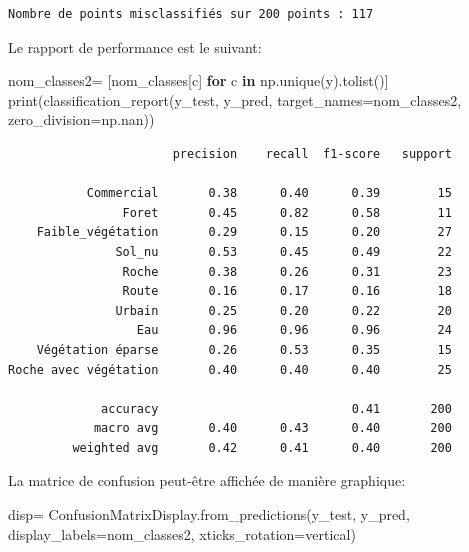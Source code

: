 \documentclass[
]{article}
\newenvironment{Shaded}{}{}
\newcommand{\BuiltInTok}[1]{\textcolor[rgb]{0.00,0.50,0.00}{#1}}
\newcommand{\ControlFlowTok}[1]{\textcolor[rgb]{0.00,0.44,0.13}{\textbf{#1}}}
\newcommand{\KeywordTok}[1]{\textcolor[rgb]{0.00,0.44,0.13}{\textbf{#1}}}
\newcommand{\NormalTok}[1]{#1}
\newcommand{\OperatorTok}[1]{\textcolor[rgb]{0.40,0.40,0.40}{#1}}
\newcommand{\StringTok}[1]{\textcolor[rgb]{0.25,0.44,0.63}{#1}}
\begin{document}
\begin{verbatim}
Nombre de points misclassifiés sur 200 points : 117
\end{verbatim}

Le rapport de performance est le suivant:

\label{8dce079d}
\label{cb31}
\begin{Shaded}
\begin{Highlighting}[]
\NormalTok{nom\_classes2}\OperatorTok{=}\NormalTok{ [nom\_classes[c] }\ControlFlowTok{for}\NormalTok{ c }\KeywordTok{in}\NormalTok{ np.unique(y).tolist()]}
\BuiltInTok{print}\NormalTok{(classification\_report(y\_test, y\_pred, target\_names}\OperatorTok{=}\NormalTok{nom\_classes2, zero\_division}\OperatorTok{=}\NormalTok{np.nan))}
\end{Highlighting}
\end{Shaded}

\begin{verbatim}
                       precision    recall  f1-score   support

           Commercial       0.38      0.40      0.39        15
                Foret       0.45      0.82      0.58        11
    Faible_végétation       0.29      0.15      0.20        27
               Sol_nu       0.53      0.45      0.49        22
                Roche       0.38      0.26      0.31        23
                Route       0.16      0.17      0.16        18
               Urbain       0.25      0.20      0.22        20
                  Eau       0.96      0.96      0.96        24
    Végétation éparse       0.26      0.53      0.35        15
Roche avec végétation       0.40      0.40      0.40        25

             accuracy                           0.41       200
            macro avg       0.40      0.43      0.40       200
         weighted avg       0.42      0.41      0.40       200
\end{verbatim}

La matrice de confusion peut-être affichée de manière graphique:

\label{fc9200e5}
\label{cb33}
\begin{Shaded}
\begin{Highlighting}[]
\NormalTok{disp}\OperatorTok{=}\NormalTok{ ConfusionMatrixDisplay.from\_predictions(y\_test, y\_pred, display\_labels}\OperatorTok{=}\NormalTok{nom\_classes2, xticks\_rotation}\OperatorTok{=}\StringTok{\textquotesingle{}vertical\textquotesingle{}}\NormalTok{)}
\end{Highlighting}
\end{Shaded}
\end{document}
